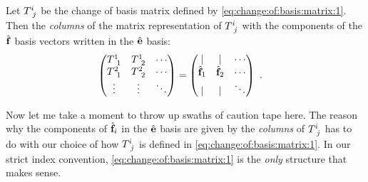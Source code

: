 \begin{newrule}\label{rule:change:of:basis:matrix}
Let $T\aij{i}{j}$ be the change of basis matrix defined by \eqref{eq:change:of:basis:matrix:1}. Then  the \emph{columns} of the matrix representation of $T\aij{i}{j}$ with the components of the $\hat{\mathbf{f}}$ basis vectors written in the $\hat{\mathbf{e}}$ basis:
\begin{align}
    \begin{pmatrix}
        T\aij{1}{1} & T\aij{1}{2} & \cdots \\
        T\aij{2}{1} & T\aij{2}{2} & \cdots \\
        \vdots & \vdots &\ddots  
    \end{pmatrix}
    &
    =
    \begin{pmatrix}
        | & | & \cdots \\
        \bas{f}_1 & \bas{f}_2 & \cdots \\
        | & | & \ddots 
    \end{pmatrix} \ .
\end{align}
\end{newrule}
Now let me take a moment to throw up swaths of caution tape here. The reason why the components of $\hat{\mathbf{f}}_i$ in the $\hat{\mathbf{e}}$ basis are given by the \emph{columns} of $T\aij{i}{j}$ has to do with our choice of how $T\aij{i}{j}$ is defined in \eqref{eq:change:of:basis:matrix:1}. In our strict index convention, \eqref{eq:change:of:basis:matrix:1} is the \emph{only} structure that makes sense. 

